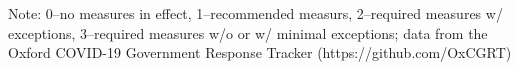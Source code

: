 \begin{table}[bp]
\begin{tabularx}{\linewidth}{p{3.5cm}|rrrr|rrrr|rrrr|CC}
\end{tabularx}
\begin{flushleft}
\footnotesize Note: 0--no measures in effect, 1--recommended measurs, 2--required measures w/ exceptions, 3--required measures w/o or w/ minimal exceptions; data from the Oxford COVID-19 Government Response Tracker (https://github.com/OxCGRT)
\end{flushleft}
\end{table}
